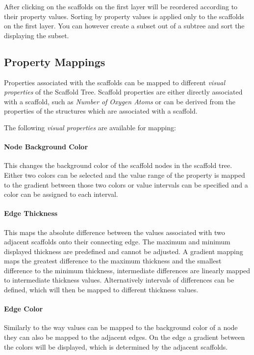 After clicking on  the scaffolds on the first layer will be reordered
according to their property values. Sorting by property values is applied only
to the scaffolds on the first layer. You can however create a subset out of a
subtree and sort the \stree displaying the subset. 

\subsection{Property Mappings}
\label{sec:treeview:propertymappings}
Properties associated with the scaffolds can be mapped to different \emph{visual
properties} of the Scaffold Tree. Scaffold properties are either directly
associated with a scaffold, such as \emph{Number of Oxygen Atoms} or can be
derived from the properties of the structures  which are associated with a
scaffold.

The following \emph{visual properties} are available for mapping:

\paragraph{Node Background Color} This changes the background color of the
scaffold nodes in the scaffold tree. Either two colors can be selected and the
value range of the property is mapped to the gradient between those two colors
or value intervals can be specified and a color can be assigned to each
interval.

\paragraph{Edge Thickness} This maps the absolute difference between the values
associated with two adjacent scaffolds onto their connecting edge. The maximum
and minimum displayed thickness are predefined and cannot be adjusted. A
gradient mapping maps the greatest difference to the maximum thickness and the
smallest difference to the minimum thickness, intermediate differences are linearly
mapped to intermediate thickness values. Alternatively intervals of differences
can be defined, which will then be mapped to different thickness values.

\paragraph{Edge Color} Similarly to the way values can be mapped to the
background color of a node they can also be mapped to the adjacent edges. On the
edge a gradient between the colors will be displayed, which is determined by the
adjacent scaffolds.

